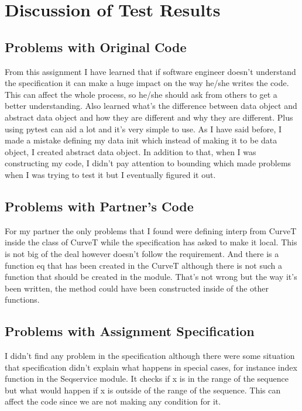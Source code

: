 \documentclass[12pt]{article}
\begin{document}
\section{Discussion of Test Results}

\subsection{Problems with Original Code}
From this assignment I have learned that if software engineer doesn't understand the specification it can make a huge impact on the way he/she writes the code. This can affect the whole process, so he/she should ask from others to get a better understanding. Also learned what's the difference between data object and abstract data object and how they are different and why they are different. Plus using pytest can aid a lot and it's very simple to use. As I have said before, I made a mistake defining my data init which instead of making it to be data object, I created abstract data object. In addition to that, when I was constructing my code, I didn't pay attention to bounding which made problems when I was trying to test it but I eventually figured it out.

\subsection{Problems with Partner's Code}
For my partner the only problems that I found were defining interp from CurveT inside the class of CurveT while the specification has asked to make it local. This is not big of the deal however doesn't follow the requirement. And there is a function eq that has been created in the CurveT although there is not such a function that should be created in the module. That's not wrong but the way it's been written, the method could have been constructed inside of the other functions.

\subsection{Problems with Assignment Specification}
I didn't find any problem in the specification although there were some situation that specification didn't explain what happens in special cases, for instance index function in the Seqservice module. It checks if x is in the range of the sequence but what would happen if x is outside of the range of the sequence. This can affect the code since we are not making any condition for it.
\end{document}
